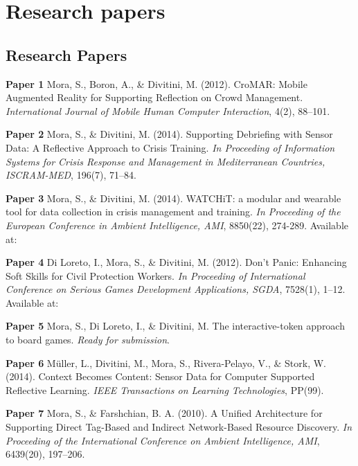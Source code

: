 \part[Part II]{Research papers}

\chapter{Research Papers}\label{papers}

\textbf{Paper 1} Mora, S., Boron, A., \& Divitini, M. (2012). CroMAR:
Mobile Augmented Reality for Supporting Reflection on Crowd Management.
\emph{International Journal of Mobile Human Computer Interaction}, 4(2),
88--101. 

\textbf{Paper 2} Mora, S., \& Divitini, M. (2014). Supporting Debriefing
with Sensor Data: A Reflective Approach to Crisis Training. \emph{In
Proceeding of Information Systems for Crisis Response and Management in
Mediterranean Countries, ISCRAM-MED}, 196(7), 71--84. 

\textbf{Paper 3} Mora, S., \& Divitini, M. (2014). WATCHiT: a modular
and wearable tool for data collection in crisis management and training.
\emph{In Proceeding of the European Conference in Ambient Intelligence,
AMI}, 8850(22), 274-289. Available at:

\textbf{Paper 4} Di Loreto, I., Mora, S., \& Divitini, M. (2012). Don't
Panic: Enhancing Soft Skills for Civil Protection Workers. \emph{In
Proceeding of International Conference on Serious Games Development
Applications, SGDA}, 7528(1), 1--12. Available at:

\textbf{Paper 5} Mora, S., Di Loreto, I., \& Divitini, M. The
interactive-token approach to board games. \emph{Ready for submission}.

\textbf{Paper 6} Müller, L., Divitini, M., Mora, S., Rivera-Pelayo, V.,
\& Stork, W. (2014). Context Becomes Content: Sensor Data for Computer
Supported Reflective Learning. \emph{IEEE Transactions on Learning
Technologies}, PP(99). 

\textbf{Paper 7} Mora, S., \& Farshchian, B. A. (2010). A Unified
Architecture for Supporting Direct Tag-Based and Indirect Network-Based
Resource Discovery. \emph{In Proceeding of the International Conference
on Ambient Intelligence, AMI}, 6439(20), 197--206. 
